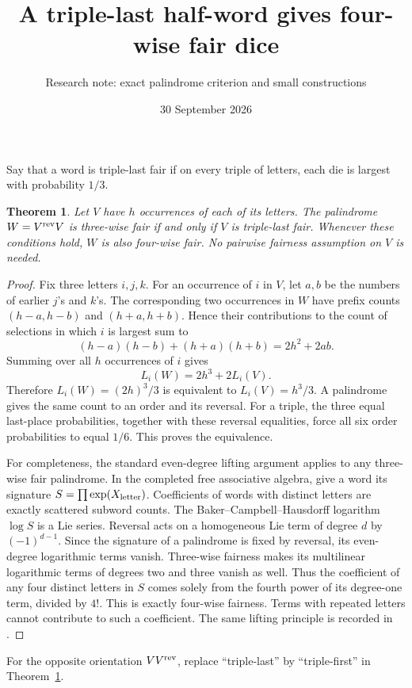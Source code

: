 \documentclass[11pt]{article}
\title{A triple-last half-word gives four-wise fair dice}
\author{Research note: exact palindrome criterion and small constructions}
\date{30 September 2026}
\newtheorem{theorem}{Theorem}
\begin{document}
\maketitle

Say that a word is triple-last fair if on every triple of letters,
each die is largest with probability $1/3$.

\begin{theorem}\label{lift}
Let $V$ have $h$ occurrences of each of its letters. The palindrome
$W=V^{\rm rev}V$ is three-wise fair if and only if $V$ is triple-last
fair. Whenever these conditions hold, $W$ is also four-wise fair.
No pairwise fairness assumption on $V$ is needed.
\end{theorem}
\begin{proof}
Fix three letters $i,j,k$. For an occurrence of $i$ in $V$, let
$a,b$ be the numbers of earlier $j$'s and $k$'s. The corresponding
two occurrences in $W$ have prefix counts $(h-a,h-b)$ and
$(h+a,h+b)$. Hence their contributions to the count of selections
in which $i$ is largest sum to
\[
 (h-a)(h-b)+(h+a)(h+b)=2h^2+2ab.
\]
Summing over all $h$ occurrences of $i$ gives
\[
 L_i(W)=2h^3+2L_i(V).
\]
Therefore $L_i(W)=(2h)^3/3$ is equivalent to $L_i(V)=h^3/3$.
A palindrome gives the same count to an order and its reversal.
For a triple, the three equal last-place probabilities, together
with these reversal equalities, force all six order probabilities
to equal $1/6$. This proves the equivalence.

For completeness, the standard even-degree lifting argument applies
to any three-wise fair palindrome. In the completed free associative
algebra, give a word its signature $S=\prod\exp(X_{\rm letter})$.
Coefficients of words with distinct letters are exactly scattered
subword counts. The Baker--Campbell--Hausdorff logarithm $\log S$
is a Lie series. Reversal acts on a homogeneous Lie term of degree
$d$ by $(-1)^{d-1}$. Since the signature of a palindrome is fixed
by reversal, its even-degree logarithmic terms vanish. Three-wise
fairness makes its multilinear logarithmic terms of degrees two
and three vanish as well. Thus the coefficient of any four distinct
letters in $S$ comes solely from the fourth power of its degree-one
term, divided by $4!$. This is exactly four-wise fairness. Terms
with repeated letters cannot contribute to such a coefficient.
The same lifting principle is recorded in
.
\end{proof}

For the opposite orientation $VV^{\rm rev}$, replace ``triple-last''
by ``triple-first'' in Theorem~\ref{lift}.
\end{document}
